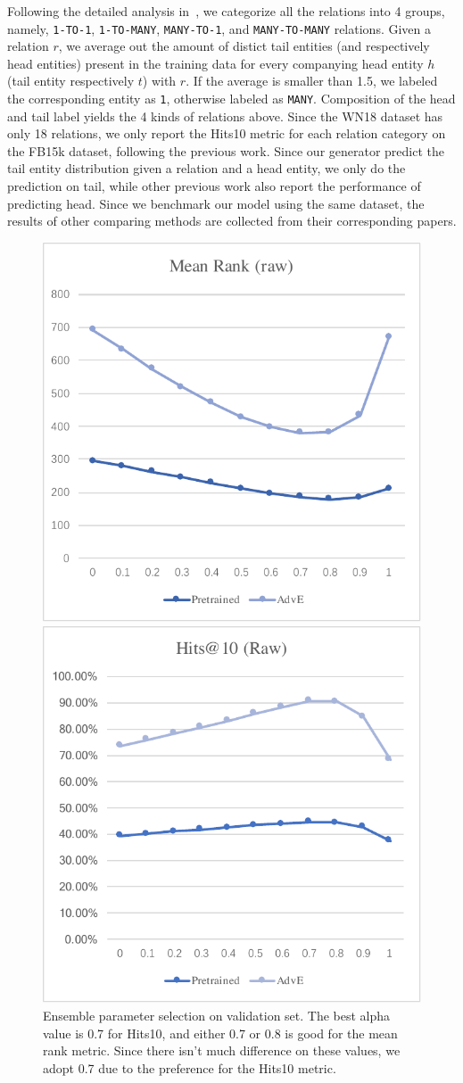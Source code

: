 \documentclass[twocolumn,a4paper,10pt,preprint,3p]{elsarticle}
\begin{document}
Following the detailed analysis in~\cite{TransE2013}, we categorize all the relations into 4 groups, namely, \texttt{1-TO-1}, \texttt{1-TO-MANY}, \texttt{MANY-TO-1}, and \texttt{MANY-TO-MANY} relations. Given a relation $r$, we average out the amount of distict tail entities (and respectively head entities) present in the training data for every companying head entity $h$ (tail entity respectively $t$) with $r$. If the average is smaller than 1.5, we labeled the corresponding entity as \texttt{1}, otherwise labeled as \texttt{MANY}. Composition of the head and tail label yields the 4 kinds of relations above. Since the WN18 dataset has only 18 relations, we only report the Hits\@10 metric for each relation category on the FB15k dataset, following the previous work. Since our generator predict the tail entity distribution given a relation and a head entity, we only do the prediction on tail, while other previous work also report the performance of predicting head. Since we benchmark our model using the same dataset, the results of other comparing methods are collected from their corresponding papers.


\begin{figure}[tp]
    \centering
    \parbox[b]{\columnwidth}{
        \centering
        \includegraphics[width=.3\textwidth]{images/ensemble-mean-rank.pdf}
        \subcaption{}        
    }
    \parbox[b]{\columnwidth}{
        \centering
        \includegraphics[width=.3\textwidth]{images/ensemble-hit10.pdf}
        \subcaption{}
    }
    \caption{Ensemble parameter selection on validation set. The best alpha value is 0.7 for Hits\@10, and either 0.7 or 0.8 is good for the mean rank metric. Since there isn't much difference on these values, we adopt 0.7 due to the preference for the Hits\@10 metric.}
\label{fig:ensemble}
\end{figure}
\end{document}
